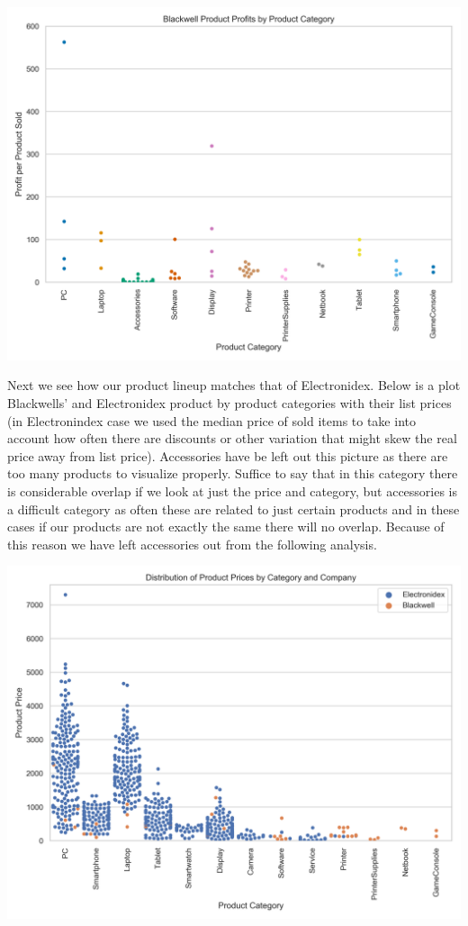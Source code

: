 \documentclass[12pt,a4paper,leqno]{report}
\theoremstyle{plain}
\theoremstyle{definition}
\theoremstyle{remark}
\begin{document}
\bigskip
{
    \centering
    \includegraphics[width=\textwidth,height=\textheight,keepaspectratio]{blackwell_product_profitability_distribution_by_category.png}
    \par
}
\bigskip

Next we see how our product lineup matches that of Electronidex. Below is a plot Blackwells' and Electronidex
product by product categories with their list prices (in Electronindex case we used the median price of sold items
to take into account how often there are discounts or other variation that might skew the real price away from list price).
Accessories have be left out this picture as there are too many products to visualize properly. Suffice to say
that in this category there is considerable overlap if we look at just the price and category, but
accessories is a difficult category as often these are related to just certain products and in these cases
if our products are not exactly the same there will no overlap. Because of this reason we have left
accessories out from the following analysis.

\bigskip
{
    \centering
    \includegraphics[width=\textwidth,height=\textheight,keepaspectratio]{product_prices_distribution_by_category_and_company.png}
    \par
}
\bigskip
\end{document}
